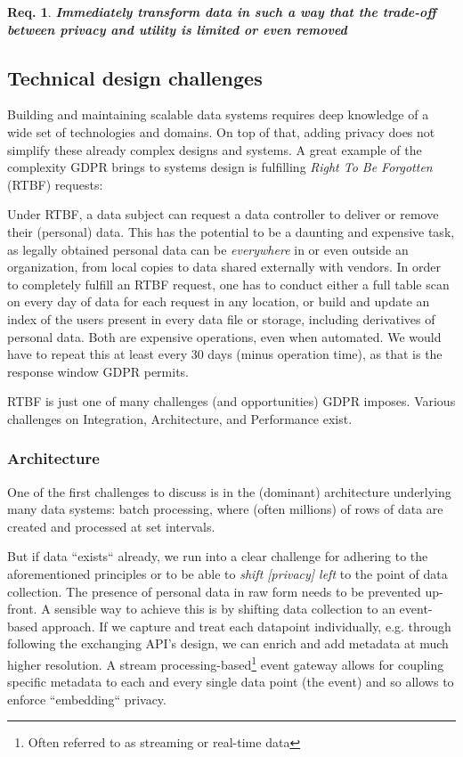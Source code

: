 \documentclass[11pt]{article} %
\newtheorem{requirement}{Req.}
\begin{document}
\begin{requirement}
\textit{\textbf{Immediately transform data in such a way that the trade-off between privacy and utility is limited or
even removed}}
\end{requirement}

\subsection{Technical design challenges}
Building and maintaining scalable data systems requires deep knowledge of a wide set of technologies and domains. On top of that, adding privacy does not simplify these already complex designs and systems. A great example of the complexity GDPR brings to systems design is fulfilling \emph{Right To Be Forgotten} (RTBF) requests: 

Under RTBF, a data subject can request a data controller to deliver or remove their (personal) data. This has the potential to be a daunting and expensive task, as legally obtained personal data can be \textit{everywhere} in or even outside an organization, from local copies to data shared externally with vendors. In order to completely fulfill an RTBF request, one has to conduct either a full table scan on every day of data for each request in any location, or build and update an index of the users present in every data file or storage, including derivatives of personal data. Both are expensive operations, even when automated. We would have to repeat this at least every 30 days (minus operation time), as that is the response window GDPR permits.

RTBF is just one of many challenges (and opportunities) GDPR imposes. Various challenges on Integration, Architecture, and Performance exist.

\newpage
\subsubsection{Architecture}
One of the first challenges to discuss is in the (dominant) architecture underlying many data systems: batch processing, where (often millions) of rows of data are created and processed at set intervals. 

But if data ``exists`` already, we run into a clear challenge for adhering to the aforementioned principles or to be able to \textit{shift [privacy] left} to the point of data collection. The presence of personal data in raw form needs to be prevented up-front. A sensible way to achieve this is by shifting data collection to an event-based approach. If we capture and treat each datapoint individually, e.g. through following the exchanging API's design, we can enrich and add metadata at much higher resolution. A stream processing-based\footnote{Often referred to as streaming or real-time data} event gateway allows for coupling specific metadata to each and every single data point (the event) and so allows to enforce ``embedding`` privacy. 
\end{document}

